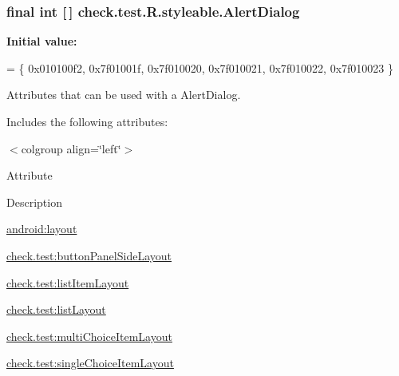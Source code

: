 \subsubsection[{Alert\+Dialog}]{\setlength{\rightskip}{0pt plus 5cm}final int \mbox{[}$\,$\mbox{]} check.\+test.\+R.\+styleable.\+Alert\+Dialog\hspace{0.3cm}{\ttfamily [static]}}\label{classcheck_1_1test_1_1_r_1_1styleable_a1d9c160813dfdd546911e783935ebb65}
{\bfseries Initial value\+:}
\begin{DoxyCode}
= \{
            0x010100f2, 0x7f01001f, 0x7f010020, 0x7f010021,
            0x7f010022, 0x7f010023
        \}
\end{DoxyCode}
Attributes that can be used with a Alert\+Dialog. 

Includes the following attributes\+:

\begin{TabularC}{0}
\hline
\end{TabularC}
$<$colgroup align=\char`\"{}left\char`\"{}$>$ 

Attribute

Description 

{\ttfamily \hyperlink{classcheck_1_1test_1_1_r_1_1styleable_a3c776b8dc9750dc9868d3e65d915a53d}{android\+:layout}}

{\ttfamily \hyperlink{classcheck_1_1test_1_1_r_1_1styleable_a929e9b246cebde3d26e0df79ede0734d}{check.\+test\+:button\+Panel\+Side\+Layout}}

{\ttfamily \hyperlink{classcheck_1_1test_1_1_r_1_1styleable_af8626e86eefaa84c9e393dc383c34a06}{check.\+test\+:list\+Item\+Layout}}

{\ttfamily \hyperlink{classcheck_1_1test_1_1_r_1_1styleable_ae130e7610181925120d23e9b40d846c5}{check.\+test\+:list\+Layout}}

{\ttfamily \hyperlink{classcheck_1_1test_1_1_r_1_1styleable_ae3a136130119ae9ebf31f7eb82968d0d}{check.\+test\+:multi\+Choice\+Item\+Layout}}

{\ttfamily \hyperlink{classcheck_1_1test_1_1_r_1_1styleable_a6be8c6aa13def4b95a7fa4ed71c5bda9}{check.\+test\+:single\+Choice\+Item\+Layout}}

